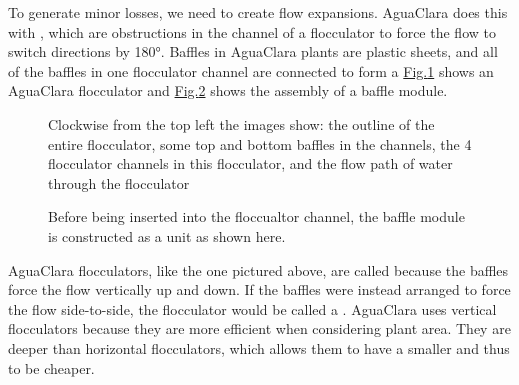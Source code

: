\documentclass[letterpaper,10pt,english]{sphinxmanual}
\begin{document}
To generate minor losses, we need to create flow expansions. AguaClara does this with , which are obstructions in the channel of a flocculator to force the flow to switch directions by 180°. Baffles in AguaClara plants are plastic sheets, and all of the baffles in one flocculator channel are connected to form a  \hyperref[\detokenize{Flocculation/Floc_Design:figure-ac-flocculator}]{Fig.\@ \ref{\detokenize{Flocculation/Floc_Design:figure-ac-flocculator}}} shows an AguaClara flocculator and \hyperref[\detokenize{Flocculation/Floc_Design:figure-baffle-module}]{Fig.\@ \ref{\detokenize{Flocculation/Floc_Design:figure-baffle-module}}} shows the assembly of a baffle module.

\begin{figure}[htbp]
\centering
\capstart

\noindent{}
\caption{Clockwise from the top left the images show: the outline of the entire flocculator, some top and bottom baffles in the channels, the 4 flocculator channels in this flocculator, and the flow path of water through the flocculator}\label{\detokenize{Flocculation/Floc_Design:id5}}\label{\detokenize{Flocculation/Floc_Design:figure-ac-flocculator}}\end{figure}

\begin{figure}[htbp]
\centering
\capstart

\noindent{}
\caption{Before being inserted into the floccualtor channel, the baffle module is constructed as a unit as shown here.}\label{\detokenize{Flocculation/Floc_Design:id6}}\label{\detokenize{Flocculation/Floc_Design:figure-baffle-module}}\end{figure}

AguaClara flocculators, like the one pictured above, are called  because the baffles force the flow vertically up and down. If the baffles were instead arranged to force the flow side-to-side, the flocculator would be called a . AguaClara uses vertical flocculators because they are more efficient when considering plant area. They are deeper than horizontal flocculators, which allows them to have a smaller  and thus to be cheaper.
\end{document}
